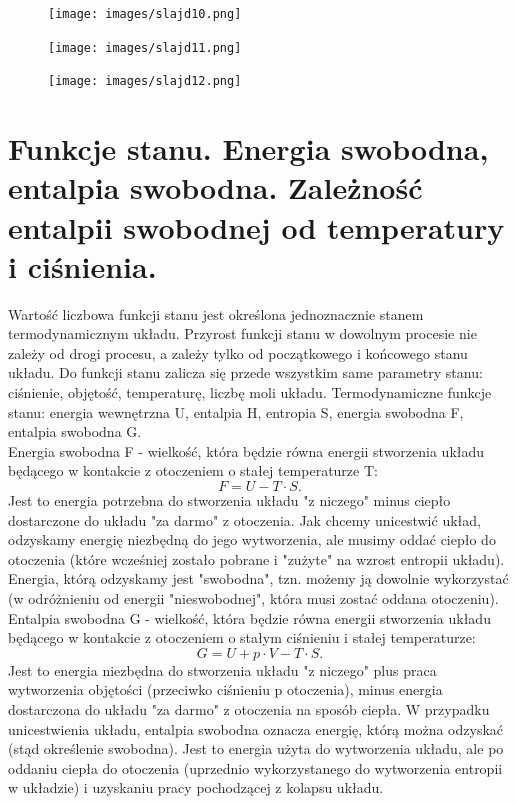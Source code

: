 \documentclass{article}
\begin{document}
\begin{figure}[H]
    \centering
    \texttt{[image: images/slajd10.png]}
\end{figure}

\begin{figure}[H]
    \centering
    \texttt{[image: images/slajd11.png]}
\end{figure}

\begin{figure}[H]
    \centering
    \texttt{[image: images/slajd12.png]}
\end{figure}

\section{Funkcje stanu. Energia swobodna, entalpia swobodna. Zależność entalpii swobodnej od temperatury i ciśnienia.}

Wartość liczbowa funkcji stanu jest określona jednoznacznie stanem termodynamicznym układu. Przyrost funkcji stanu w dowolnym procesie nie zależy od drogi procesu, a zależy tylko od początkowego i końcowego stanu układu. Do funkcji stanu zalicza się przede wszystkim same parametry stanu: ciśnienie, objętość, temperaturę, liczbę moli układu. Termodynamiczne funkcje stanu: energia wewnętrzna U, entalpia H, entropia S, energia swobodna F, entalpia swobodna G.  \\
Energia swobodna F - wielkość, która będzie równa energii stworzenia układu będącego w kontakcie z otoczeniem o stałej temperaturze T:
\begin{equation}
    F = U - T\cdot S.
\end{equation}
Jest to energia potrzebna do stworzenia układu "z niczego" minus ciepło dostarczone do układu "za darmo" z otoczenia. Jak chcemy unicestwić układ, odzyskamy energię niezbędną do jego wytworzenia, ale musimy oddać ciepło do otoczenia (które wcześniej zostało pobrane i "zużyte" na wzrost entropii układu). Energia, którą odzyskamy jest "swobodna", tzn. możemy ją dowolnie wykorzystać (w odróżnieniu od energii "nieswobodnej", która musi zostać oddana otoczeniu). \\
Entalpia swobodna G - wielkość, która będzie równa energii stworzenia układu będącego w kontakcie z otoczeniem o stałym ciśnieniu i stałej temperaturze:
\begin{equation}
    G = U + p\cdot V - T\cdot S.
\end{equation}
Jest to energia niezbędna do stworzenia układu "z niczego" plus praca wytworzenia objętości (przeciwko ciśnieniu p otoczenia), minus energia dostarczona do układu "za darmo" z otoczenia na sposób ciepła. W przypadku unicestwienia układu, entalpia swobodna oznacza energię, którą można odzyskać (stąd określenie swobodna). Jest to energia użyta do wytworzenia układu, ale po oddaniu ciepła do otoczenia (uprzednio wykorzystanego do wytworzenia entropii w układzie) i uzyskaniu pracy pochodzącej z kolapsu układu. 
\end{document}
